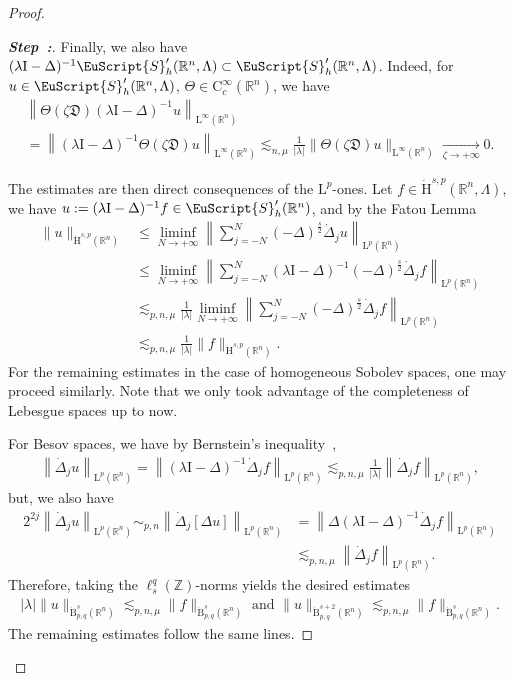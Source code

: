\documentclass[10pt]{amsart}
\theoremstyle{definition}\newtheorem{defi}[theo]{Definition}\newtheorem{rema}[theo]{Remark}\newtheorem{exam}[theo]{Example}\newtheorem{exem}[theo]{Example}\newtheorem{nota}[theo]{Notation}
\newcommand{\bbR}{\mathbb{R}}
\newcommand{\bbZ}{\mathbb{Z}}
\newcommand{\rmH}{\mathrm{H}}%
\newcommand{\rmB}{\mathrm{B}}
\newcommand{\rmL}{\mathrm{L}}
\newcommand{\rmC}{\mathrm{C}}
\newcommand{\rmI}{\mathrm{I}}
\newcommand{\fkD}{\mathfrak{D}}
\newcommand{\eus}{\EuScript}
\newcounter{stepcount}
\newenvironment{step}{\refstepcounter{stepcount}\begin{proof}[\textbf{Step~\thestepcount:}]}{\let\qed\relax\end{proof}}
\begin{document}
\begin{proof}
\begin{step}
Finally, we also have $(\lambda\rmI -\Delta)^{-1}\eus{S}'_h(\bbR^n,\Lambda)\subset\eus{S}'_h(\bbR^n,\Lambda)$. Indeed, for $u\in \eus{S}'_h(\bbR^n,\Lambda)$, $\Theta \in \rmC _c^\infty(\bbR^n)$, we have
\begin{multline*}
\left\| \Theta(\zeta \fkD ) (\lambda\rmI -\Delta)^{-1}u\right\|_{\rmL^\infty(\bbR^n)}
\\
=\left\| (\lambda\rmI -\Delta)^{-1}\Theta(\zeta \fkD) u\right\|_{\rmL^\infty(\bbR^n)} \lesssim_{n,\mu} \frac{1}{|\lambda|} \| \Theta(\zeta \fkD) u \|_{\rmL^\infty(\bbR^n)} \xrightarrow[\zeta\rightarrow+\infty]{} 0.
\end{multline*}

The estimates are then direct consequences of the $\rmL^p$-ones. Let $f\in\dot{\rmH}^{s,p}(\bbR^n,\Lambda)$, we have $u:=(\lambda\rmI -\Delta)^{-1}f\in\eus{S}'_h(\bbR^n)$, and by the Fatou Lemma
\begin{align*}
\| u \|_{\dot{\rmH}^{s,p}(\bbR^n)} &\leqslant \liminf_{N\rightarrow+\infty} \left\| \sum_{j=-N}^{N} (-\Delta)^\frac{s}{2}\dot{\Delta}_j u\right\|_{{\rmL}^{p}(\bbR^n)}\\ 
&\leqslant \liminf_{N\rightarrow+\infty} \left\| \sum_{j=-N}^{N} (\lambda \rmI -\Delta)^{-1}(-\Delta)^\frac{s}{2}\dot{\Delta}_j f\right\|_{{\rmL}^{p}(\bbR^n)}\\
&\lesssim_{p,n,\mu} \frac{1}{|\lambda|} \liminf_{N\rightarrow+\infty} \left\| \sum_{j=-N}^{N}(-\Delta)^\frac{s}{2}\dot{\Delta}_j f\right\|_{{\rmL}^{p}(\bbR^n)}\\
&\lesssim_{p,n,\mu} \frac{1}{|\lambda|} \| f\|_{\dot{\rmH}^{s,p}(\bbR^n)}.
\end{align*}
For the remaining estimates in the case of homogeneous Sobolev spaces, one may proceed similarly. Note that we only took advantage of the completeness of Lebesgue spaces up to now.

For Besov spaces, we have by Bernstein's inequality~\cite[Lemma~2.1]{bookBahouriCheminDanchin},
\begin{align*}
\left\| \dot{\Delta}_j u\right\|_{\rmL^{{p}}(\bbR^n)} = \left\| (\lambda\rmI -\Delta)^{-1} \dot{\Delta}_j f\right\|_{\rmL^{{p}}(\bbR^n)} \lesssim_{p,n,\mu} \frac{1}{|\lambda|}\left\| \dot{\Delta}_j f\right\|_{\rmL^{{p}}(\bbR^n)},
\end{align*}
but, we also have
\begin{align*}
2^{2j}\left\| \dot{\Delta}_j u\right\|_{\rmL^{{p}}(\bbR^n)}\sim_{{p},n} \left\| \dot{\Delta}_j [\Delta u]\right\|_{\rmL^{p}(\bbR^n)} &=
\left\| \Delta(\lambda\rmI -\Delta)^{-1} \dot{\Delta}_j f\right\|_{\rmL^{p}(\bbR^n)} 
\\
&\lesssim_{p,n,\mu}\left\| \dot{\Delta}_j f\right\|_{\rmL^{{p}}(\bbR^n)}.
\end{align*}
Therefore, taking the $\ell^q_s(\bbZ)$-norms yields the desired estimates
\begin{align*}
|\lambda|\| u \|_{\dot{\rmB}^{s}_{p,q}(\bbR^n)}\lesssim_{p,n,\mu} \| f \|_{\dot{\rmB}^{s}_{p,q}(\bbR^n)} \text{ and } \| u \|_{\dot{\rmB}^{s+2}_{p,q}(\bbR^n)}\lesssim_{p,n,\mu} \| f \|_{\dot{\rmB}^{s}_{p,q}(\bbR^n)}.
\end{align*}
The remaining estimates follow the same lines.


\end{step}
\end{proof}
\end{document}
